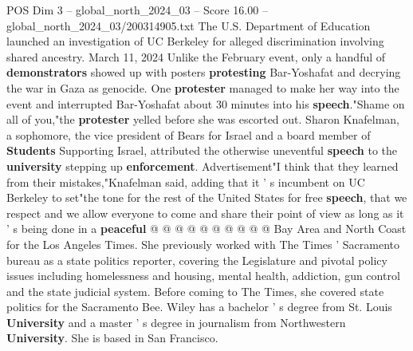 \begin{textsample}{POS Dim 3 – global\_north\_2024\_03 – Score 16.00 – global\_north\_2024\_03/200314905.txt}
The U.S.
Department of Education launched an investigation of UC Berkeley for alleged discrimination involving shared ancestry.
March 11, 2024 Unlike the February event, only a handful of \textbf{demonstrators} showed up with posters \textbf{protesting} Bar-Yoshafat and decrying the war in Gaza as genocide.
One \textbf{protester} managed to make her way into the event and interrupted Bar-Yoshafat about 30 minutes into his \textbf{speech}."Shame on all of you,"the \textbf{protester} yelled before she was escorted out.
Sharon Knafelman, a sophomore, the vice president of Bears for Israel and a board member of \textbf{Students} Supporting Israel, attributed the otherwise uneventful \textbf{speech} to the \textbf{university} stepping up \textbf{enforcement}.
Advertisement"I think that they learned from their mistakes,"Knafelman said, adding that it ' s incumbent on UC Berkeley to set"the tone for the rest of the United States for free \textbf{speech}, that we respect and we allow everyone to come and share their point of view as long as it ' s being done in a \textbf{peaceful} @ @ @ @ @ @ @ @ @ @ Bay Area and North Coast for the Los Angeles Times.
She previously worked with The Times ' Sacramento bureau as a state politics reporter, covering the Legislature and pivotal policy issues including homelessness and housing, mental health, addiction, gun control and the state judicial system.
Before coming to The Times, she covered state politics for the Sacramento Bee.
Wiley has a bachelor ' s degree from St.
Louis \textbf{University} and a master ' s degree in journalism from Northwestern \textbf{University}.
She is based in San Francisco.

\end{textsample}
